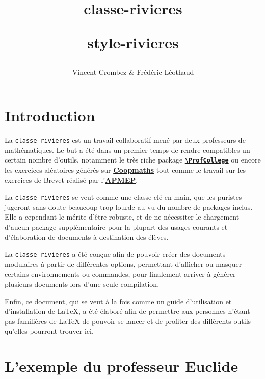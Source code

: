 \documentclass[graine=2]{classe-rivieres}
\title{\bfseries classe-rivieres\par \large style-rivieres}
\author{Vincent Crombez \& Frédéric Léothaud}
\date{}
\begin{document}
%

\maketitle


\newpage


\tableofcontents

\newpage

{}
\section*{Introduction}

La \texttt{classe-rivieres} est un travail collaboratif mené par deux professeurs de mathématiques. Le but a été dans un premier temps de rendre compatibles un certain nombre d'outils, notamment le très riche package \href{https://ctan.org/pkg/profcollege}{\texttt{\textbf{\textbackslash ProfCollege}}} ou encore les exercices aléatoires générés sur \href{https://coopmaths.fr/}{\textbf{Coopmaths}} tout comme le travail sur les exercices de Brevet réalisé par l'\href{https://www.apmep.fr/Annales-du-Brevet-des-colleges}{\textbf{APMEP}}.

La \texttt{classe-rivieres} se veut comme une classe clé en main, que les puristes jugeront sans doute beaucoup trop lourde au vu du nombre de packages inclus. Elle a cependant le mérite d'être robuste, et de ne nécessiter le chargement d'aucun package supplémentaire pour la plupart des usages courants et d'élaboration de documents à destination des élèves.

La \texttt{classe-rivieres} a été conçue afin de pouvoir créer des documents modulaires à partir de différentes options, permettant d'afficher ou masquer certains environnements ou commandes, pour finalement arriver à générer plusieurs documents lors d'une seule compilation.

Enfin, ce document, qui se veut à la fois comme un guide d'utilisation et d'installation de LaTeX, a été élaboré afin de permettre aux personnes n'étant pas familières de LaTeX de pouvoir se lancer et de profiter des différents outils qu'elles pourront trouver ici.


\section{L'exemple du professeur Euclide}
\end{document}
